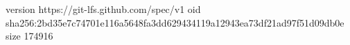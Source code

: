 version https://git-lfs.github.com/spec/v1
oid sha256:2bd35e7c74701e116a5648fa3dd629434119a12943ea73df21ad97f51d09db0e
size 174916
